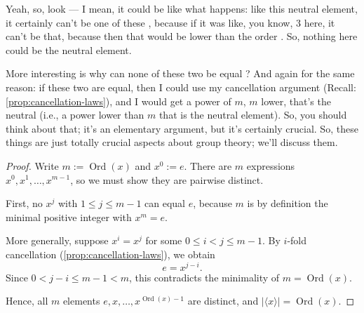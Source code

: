 \begin{speech}[01:26:31 - 01:27:11]
Yeah, so, look --- I mean, it could be like what happens: like this neutral element, it certainly can't be one of these , because if it was like, you know, $3$ here, it can't be that, because then that would be lower than the order . So, nothing here could be the neutral element.

More interesting is why can none of these two be equal ? And again for the same reason: if these two are equal, then I could use my cancellation argument (Recall: \cref{prop:cancellation-laws}), and I would get a power of $m$, $m$ lower, that's the neutral (i.e., a power lower than $m$ that is the neutral element). So, you should think about that; it's an elementary argument, but it's certainly crucial. So, these things are just totally crucial aspects about group theory; we'll discuss them.
\end{speech}

\begin{content}


\begin{proof}
Write $m := \operatorname{Ord}(x)$ and $x^0 := e$. There are $m$ expressions $x^0, x^1, \dots, x^{m-1}$, so we must show they are pairwise distinct.

First, no $x^j$ with $1 \le j \le m - 1$ can equal $e$, because $m$ is by definition the minimal positive integer with $x^m = e$.

More generally, suppose $x^i = x^j$ for some $0 \le i < j \le m - 1$. By $i$-fold cancellation (\cref{prop:cancellation-laws}), we obtain
\[
e = x^{j - i}.
\]
Since $0 < j - i \le m - 1 < m$, this contradicts the minimality of $m = \operatorname{Ord}(x)$.

Hence, all $m$ elements $e, x, \dots, x^{\operatorname{Ord}(x)-1}$ are distinct, and $|\langle x \rangle| = \operatorname{Ord}(x)$.
\end{proof}
\end{content}

